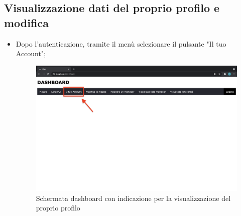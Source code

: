 \subsection{Visualizzazione dati del proprio profilo e modifica}
\begin{itemize}
    \item Dopo l'autenticazione, tramite il menù selezionare il pulsante "Il tuo Account";
    \begin{figure}[H]
        \centering
        \includegraphics[scale=0.12]{res/images/dashboard3.png}
        \caption{Schermata dashboard con indicazione per la visualizzazione del proprio profilo}
    \end{figure}
    

\end{itemize}
